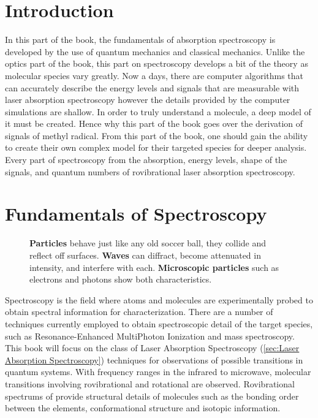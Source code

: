 \documentclass[11pt,a4paper]{book}
\newcommand{\imginput}[1]{} %
\begin{document}
\chapter*{Introduction}
	In this part of the book, the fundamentals of absorption spectroscopy is developed by the use of quantum mechanics and classical mechanics. Unlike the optics part of the book, this part on spectroscopy develops a bit of the theory as molecular species vary greatly. Now a days, there are computer algorithms that can accurately describe the energy levels and signals that are measurable with laser absorption spectroscopy however the details provided by the computer simulations are shallow. In order to truly understand a molecule, a deep model of it must be created. Hence why this part of the book goes over the derivation of signals of methyl radical. From this part of the book, one should gain the ability to create their own complex model for their targeted species for deeper analysis. Every part of spectroscopy from the absorption, energy levels, shape of the signals, and quantum numbers of rovibrational laser absorption spectroscopy.
	
\chapter{Fundamentals of Spectroscopy}
	\label{chp:Fundamentals of Spectroscopy}
	
	\begin{figure} [!ht]
		\centering
		\Large
		\def\svgwidth{\columnwidth}
		\resizebox{13.5cm}{!}{\imginput{images/particle-wave-duality.pdf_tex}}
		\caption{{\bfseries Particles} behave just like any old soccer ball, they collide and reflect off surfaces. \newline
			{\bfseries Waves} can diffract, become attenuated in intensity, and interfere with each. \newline
			{\bfseries Microscopic particles} such as electrons and photons show both characteristics.}
		\label{fig:particle-wave-duality}
	\end{figure}
	
	Spectroscopy is the field where atoms and molecules are experimentally probed to obtain spectral information for characterization. There are a number of techniques currently employed to obtain spectroscopic detail of the target species, such as Resonance-Enhanced MultiPhoton Ionization and mass spectroscopy. This book will focus on the class of Laser Absorption Spectroscopy (\autoref{sec:Laser Absorption Spectroscopy}) techniques for observations of possible transitions in quantum systems. With frequency ranges in the infrared to microwave, molecular transitions involving rovibrational and rotational are observed. Rovibrational spectrums of provide structural details of molecules such as the bonding order between the elements, conformational structure and isotopic information. 
	
\end{document}
